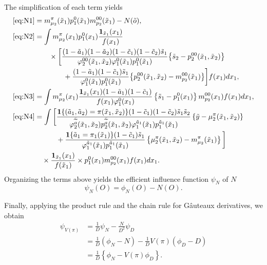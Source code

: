 \documentclass{article}
\newcommand{\pk}{{\varphi}}
\begin{document}
The simplification of each term yields
\begin{align*}
	\eqref{eq:N1} &= m_{\mu_2}^\pi(\tilde x_1) p_1^0(\tilde x_1) m_{p_2}^{00}(\tilde x_1) - N(\tilde o), \\
	\eqref{eq:N2} &= \int m_{\mu_2}^\pi(x_1) p_1^0(x_1) \frac{\mathbf1_{\tilde x_1}(x_1)}{f(x_1)}\\
	  &\qquad\times \bigg[
	    \frac{(1-\tilde a_1)(1-\tilde a_2)(1-\tilde c_1)(1-\tilde c_2)\tilde s_1}{\pk_2^{00}(\tilde x_1, \tilde x_2)\pk_1^0(\tilde x_1)p_1^0(\tilde x_1)} \big\{ \tilde s_2 - p_2^{00}(\tilde x_1, \tilde x_2) \big\} \\
	    &\qquad\qquad+
	     \frac{(1-\tilde a_1)(1-\tilde c_1)\tilde s_1}{\pk_1^0(\tilde x_1)p_1^0(\tilde x_1)} \big\{ p_2^{00}(\tilde x_1, \tilde x_2) - m_{p_2}^{00}(\tilde x_1) \big\}  \bigg] f(x_1) dx_1, \\
	\eqref{eq:N3} &= \int m_{\mu_2}^\pi(x_1) 
	  \frac{\mathbf1_{\tilde x_1}(x_1) (1-\tilde a_1)(1-\tilde c_1)}{f(x_1) \pk_1^0(x_1)} \left\{ \tilde s_1 - p_1^0(x_1) \right\}
	  m_{p_2}^{00}(x_1) f(x_1) dx_1, \\
	\eqref{eq:N4} &= \int
	\bigg[ \frac{\mathbf1\{(\tilde a_1, \tilde a_2)=\pi(\tilde x_1, \tilde x_2)\}(1-\tilde c_1)(1 - \tilde c_2)\tilde s_1\tilde s_2}{\pk_2^{\bar{\widetilde a}}(\tilde x_1, \tilde x_2)p_2^{\bar{\widetilde a}}(\tilde x_1, \tilde x_2) \pk_1^{\tilde a_1}(\tilde x_1)p_1^{\tilde a_1}(\tilde x_1)} \left\{ \tilde y - \mu_2^{\pi}(\tilde x_1, \tilde x_2) \right\} \\
	  &\qquad\quad+ \frac{\mathbf1\{\tilde a_1 = \pi_1(\tilde x_1)\}(1-{\tilde c_1}){\tilde s_1}}{\pk_1^{\tilde a_1}(\tilde x_1)p_1^{\tilde a_1}(\tilde x_1)} \left\{ \mu_2^{\pi}(\tilde x_1, \tilde x_2) - m_{\mu_2}^\pi(\tilde x_1) \right\}
	\bigg]\\
	&\quad\times \frac{\mathbf1_{\tilde x_1}(x_1)}{f(\tilde x_1)} \times p_1^0(x_1) m_{p_2}^{00}(x_1) f(x_1) dx_1.
\end{align*}
Organizing the terms above yields the efficient influence function $\psi_N$ of $N$
\[
\psi_N(O) = \phi_N(O) - N(O).
\]



Finally, applying the product rule and the chain rule for G\^auteaux derivatives, we obtain
\begin{align*} 
	\psi_{V(\pi)}
	&= \frac1D\psi_N - \frac{N}{D^2}\psi_D \\
	&= \frac1D (\phi_N - N) - \frac1D V(\pi) (\phi_D - D) \\
	&= \frac1D \left\{ \phi_N - V(\pi)\phi_D \right\}.
	\label{eq:IF-ratio}
\end{align*}
\end{document}
